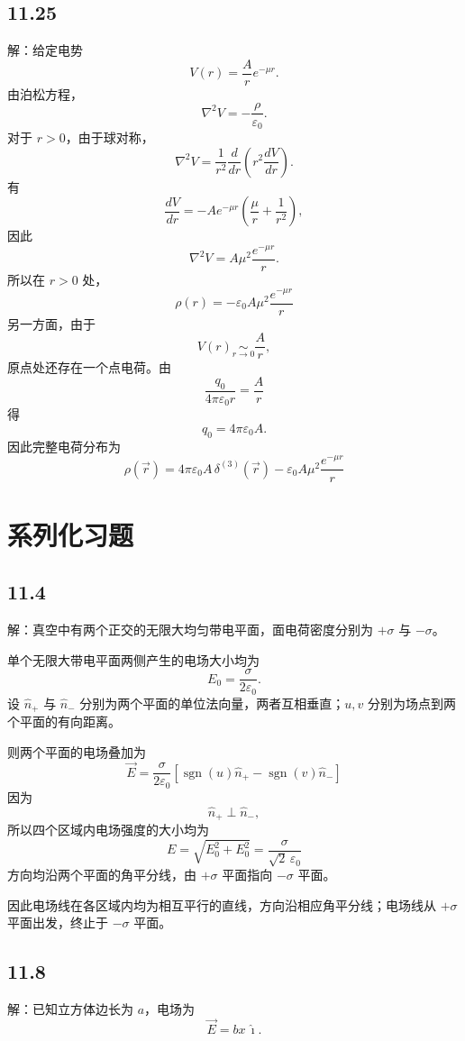 \documentclass[UTF8,a4paper,12pt]{ctexart}
\begin{document}
\subsection*{11.25}

解：给定电势
\[
V(r)
=
\frac{A}{r}e^{-\mu r}.
\]
由泊松方程，
\[
\nabla^2V
=
-\frac{\rho}{\varepsilon_0}.
\]
对于 $r>0$，由于球对称，
\[
\nabla^2V
=
\frac{1}{r^2}
\frac{d}{dr}
\left(
r^2\frac{dV}{dr}
\right).
\]
有
\[
\frac{dV}{dr}
=
-Ae^{-\mu r}
\left(
\frac{\mu}{r}
+
\frac{1}{r^2}
\right),
\]
因此
\[
\nabla^2V
=
A\mu^2\frac{e^{-\mu r}}{r}.
\]
所以在 $r>0$ 处，
\[
\boxed{
\rho(r)
=
-\varepsilon_0A\mu^2
\frac{e^{-\mu r}}{r}
}
\]
另一方面，由于
\[
V(r)\underset{r\to0}{\sim}\frac{A}{r},
\]
原点处还存在一个点电荷。由
\[
\frac{q_0}{4\pi\varepsilon_0r}
=
\frac{A}{r}
\]
得
\[
q_0=4\pi\varepsilon_0A.
\]
因此完整电荷分布为
\[
\boxed{
\rho(\vec{r})
=
4\pi\varepsilon_0A\,
\delta^{(3)}(\vec{r})
-
\varepsilon_0A\mu^2
\frac{e^{-\mu r}}{r}
}
\]

\section*{系列化习题}

\subsection*{11.4}

解：真空中有两个正交的无限大均匀带电平面，面电荷密度分别为 $+\sigma$ 与 $-\sigma$。

单个无限大带电平面两侧产生的电场大小均为
\[
E_0=\frac{\sigma}{2\varepsilon_0}.
\]
设 $\hat{n}_+$ 与 $\hat{n}_-$ 分别为两个平面的单位法向量，两者互相垂直；$u,v$ 分别为场点到两个平面的有向距离。

则两个平面的电场叠加为
\[
\boxed{
\vec{E}
=
\frac{\sigma}{2\varepsilon_0}
\left[
\operatorname{sgn}(u)\hat{n}_+
-
\operatorname{sgn}(v)\hat{n}_-
\right]
}
\]
因为
\[
\hat{n}_+\perp\hat{n}_-,
\]
所以四个区域内电场强度的大小均为
\[
\boxed{
E
=
\sqrt{E_0^2+E_0^2}
=
\frac{\sigma}{\sqrt{2}\,\varepsilon_0}
}
\]
方向均沿两个平面的角平分线，由 $+\sigma$ 平面指向 $-\sigma$ 平面。

因此电场线在各区域内均为相互平行的直线，方向沿相应角平分线；电场线从 $+\sigma$ 平面出发，终止于 $-\sigma$ 平面。

\subsection*{11.8}

解：已知立方体边长为 $a$，电场为
\[
\vec{E}=bx\,\hat{\imath}.
\]
\end{document}

